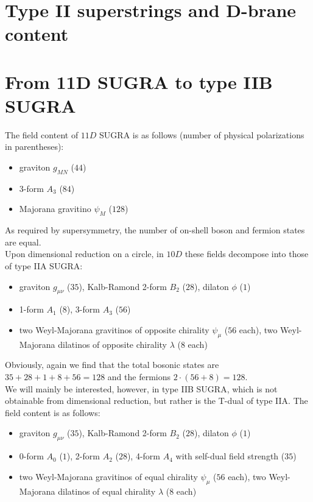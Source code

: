 \documentclass[11pt,a4paper,twoside,openright]{book}
\begin{document}
\section{Type II superstrings and D-brane content}

\section{From 11D SUGRA to type IIB SUGRA}

The field content of $11D$ SUGRA is as follows (number of physical polarizations in parentheses):

\begin{itemize}
\item graviton $g_{MN}$ ($44$)
\item 3-form $A_3$ ($84$)
\item Majorana gravitino $\psi_M$ ($128$)
\end{itemize}

As required by supersymmetry, the number of on-shell boson and fermion states are equal.\\

Upon dimensional reduction on a circle, in $10D$ these fields decompose into those of type IIA SUGRA:

\begin{itemize}
\item graviton $g_{\mu\nu}$ ($35$), Kalb-Ramond 2-form $B_2$ ($28$), dilaton $\phi$ ($1$)
\item 1-form $A_1$ ($8$), 3-form $A_3$ ($56$)
\item two Weyl-Majorana gravitinos of opposite chirality $\psi_\mu$ ($56$ each), two Weyl-Majorana dilatinos of opposite chirality $\lambda$ ($8$ each)
\end{itemize}

Obviously, again we find that the total bosonic states are $35+28+1+8+56 = 128$ and the fermions $2\cdot (56+8) = 128$.\\

We will mainly be interested, however, in type IIB SUGRA, which is not obtainable from dimensional reduction, but rather is the T-dual of type IIA. The field content is as follows:

\begin{itemize}
\item graviton $g_{\mu\nu}$ ($35$), Kalb-Ramond 2-form $B_2$ ($28$), dilaton $\phi$ ($1$)
\item 0-form $A_0$ ($1$), 2-form $A_2$ ($28$), 4-form $A_4$ with self-dual field strength ($35$)
\item two Weyl-Majorana gravitinos of equal chirality $\psi_\mu$ ($56$ each), two Weyl-Majorana dilatinos of equal chirality $\lambda$ ($8$ each)
\end{itemize}
\end{document}
